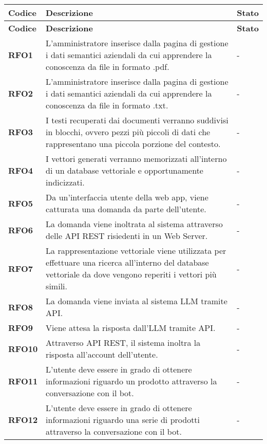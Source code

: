 \begin{longtable}{|>{\centering\arraybackslash}m{}|>{\centering\arraybackslash}m{}|>{\centering\arraybackslash}m{}|}
	\hline
	\textbf{Codice} & \textbf{Descrizione} & \textbf{Stato}\\\hline
	\endfirsthead
	\hline
	\textbf{Codice} & \textbf{Descrizione} & \textbf{Stato}\\\hline
	\endhead
	\hline
    \textbf{RFO1} & L'amministratore inserisce dalla pagina di gestione i dati semantici aziendali da cui apprendere la conoscenza da file in formato .pdf. & - \\
    \hline
    \textbf{RFO2} & L'amministratore inserisce dalla pagina di gestione i dati semantici aziendali da cui apprendere la conoscenza da file in formato .txt. & - \\
    \hline
    \textbf{RFO3} & I testi recuperati dai documenti verranno suddivisi in blocchi, ovvero pezzi più piccoli di dati che rappresentano una piccola porzione del contesto. & - \\
    \hline
    \textbf{RFO4} & I vettori generati verranno memorizzati all’interno di un database vettoriale e opportunamente indicizzati. & - \\
    \hline
    \textbf{RFO5} & Da un’interfaccia utente della web app, viene catturata una domanda da parte dell’utente. & - \\
    \hline
    \textbf{RFO6} & La domanda viene inoltrata al sistema attraverso delle API REST risiedenti in un Web Server. & - \\
    \hline
    \textbf{RFO7} & La rappresentazione vettoriale viene utilizzata per effettuare una ricerca all’interno del database vettoriale da dove vengono reperiti i vettori più simili. & - \\
    \hline
    \textbf{RFO8} & La domanda viene inviata al sistema LLM tramite API. & - \\
    \hline
    \textbf{RFO9} & Viene attesa la risposta dall'LLM tramite API. & - \\
    \hline
    \textbf{RFO10} & Attraverso API REST, il sistema inoltra la risposta all'account dell’utente. & - \\
    \hline
    \textbf{RFO11} & L'utente deve essere in grado di ottenere informazioni riguardo un prodotto attraverso la conversazione con il bot. & - \\
    \hline
    \textbf{RFO12} & L'utente deve essere in grado di ottenere informazioni riguardo una serie di prodotti attraverso la conversazione con il bot. & - \\

\end{longtable}
